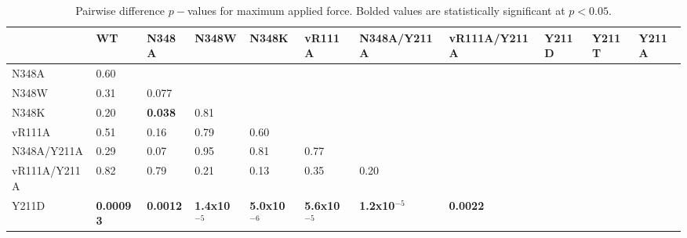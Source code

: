 \documentclass[12pt]{article}
\begin{document}
\clearpage
\begin {table}[H]
\caption{\label{tab:MAF_p}Pairwise difference $p-$values for maximum applied force. Bolded values are statistically significant at $p<0.05$.}
\begin{center}
  \resizebox{16cm}{!} {
    \begin{tabular}{l l l l l l l l l l l}
    \hline
                & WT                      & N348A                   & N348W                   & N348K                   & vR111A                  & N348A/Y211A               & vR111A/Y211A            & Y211D                   & Y211T                   & Y211A  \\ \hline
    N348A       & 0.60                    &                         &                         &                         &                         &                           &                         &                         &                         &        \\
    N348W       & 0.31                    & 0.077                   &                         &                         &                         &                           &                         &                         &                         &        \\
    N348K       & 0.20                    & \textbf{0.038}          & 0.81                    &                         &                         &                           &                         &                         &                         &        \\
   vR111A       & 0.51                    & 0.16                    & 0.79                    & 0.60                    &                         &                           &                         &                         &                         &        \\
    N348A/Y211A & 0.29                    & 0.07                    & 0.95                    & 0.81                    & 0.77                    &                           &                         &                         &                         &        \\
   vR111A/Y211A & 0.82                    & 0.79                    & 0.21                    & 0.13                    & 0.35                    & 0.20                      &                         &                         &                         &        \\
    Y211D       & \textbf{0.00093}        & \textbf{0.0012}         & \textbf{1.4x10$^{-5}$}  & \textbf{5.0x10$^{-6}$}  & \textbf{5.6x10$^{-5}$}  & \textbf{1.2x10$^{-5}$}    & \textbf{0.0022}         &                         &                         &        \\

\end{tabular}}
\end{center}
\end{table}
\end{document}
